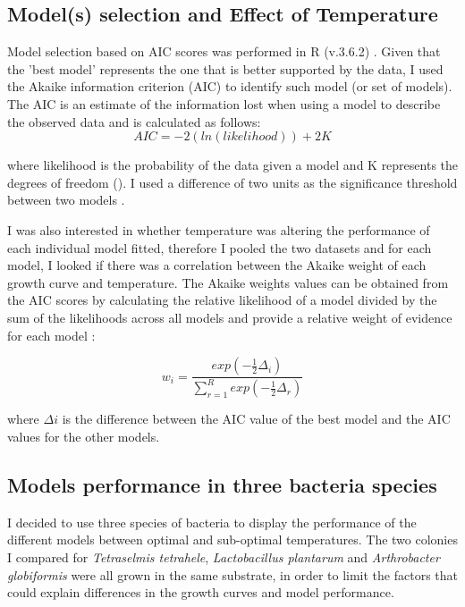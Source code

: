 \documentclass[a4paper]{article}
\begin{document}
    \subsection{Model(s) selection and Effect of Temperature}
    Model selection based on AIC scores was performed in R (v.3.6.2) \citep{Rcit}.\newline
    Given that the 'best model' represents the one that is better supported by the data, I used the Akaike information criterion (AIC) to identify such model (or set of models). The AIC is an estimate of the information lost when using a model to describe the observed data \citep{johnson2004model} and is calculated as follows:
\begin{equation}
\label{eqn:AIC}
AIC = -2 ( ln ( likelihood )) + 2 K
\end{equation}

where likelihood is the probability of the data given a model and K represents the degrees of freedom (\citep{doi:10.1177/0049124104268644}). 
    I used a difference of two units as the significance threshold between two models \citep{doi:10.1177/0049124104268644}. \par 
    
    I was also interested in whether temperature was altering the performance of each individual model fitted, therefore I pooled the two datasets and for each model, I looked if there was a correlation between the Akaike weight of each growth curve and temperature. The Akaike weights values can be obtained from the AIC scores by calculating the relative likelihood of a model divided by the sum of the likelihoods across all models and provide a relative weight of evidence for each model \citep{johnson2004model, symonds2011brief}:
    
\begin{equation}
 w_i =\frac{exp(-\frac{1}{2}\Delta _i)}{ \sum_{r=1}^{R} exp(-\frac{1}{2}\Delta _r)}
\end{equation}

    where $\Delta i$ is the difference between the AIC value of the best model and the AIC values for the other models.
    
    \subsection{Models performance in three bacteria species}
    I decided to use three species of bacteria to display the performance of the different models between optimal and sub-optimal temperatures. The two colonies I compared for \textit{Tetraselmis tetrahele}, \textit{Lactobacillus plantarum} and \textit{Arthrobacter globiformis} were all grown in the same substrate, in order to limit the factors that could explain differences in the growth curves and model performance. 
    
\end{document}
